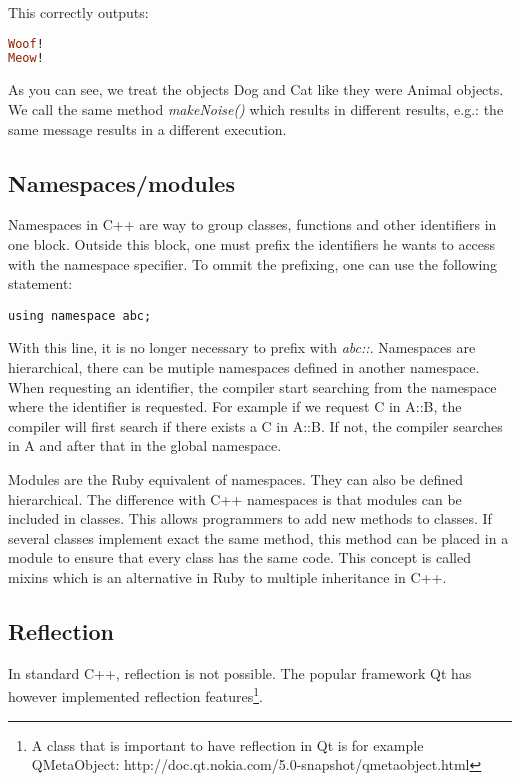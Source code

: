 \documentclass[10pt,a4paper,twocolumn]{article}
\begin{document}
This correctly outputs: 

\begin{lstlisting}[language=Ruby]
Woof!
Meow!
\end{lstlisting}

As you can see, we treat the objects Dog and Cat like they were Animal objects. We call the same method \textit{makeNoise()} which results in different results, e.g.: the same message results in a different execution.

\subsection{Namespaces/modules}
Namespaces in C++ are way to group classes, functions and other identifiers in one block. Outside this block, one must prefix the identifiers he wants to access with the namespace specifier. To ommit the prefixing, one can use the following statement:

\begin{lstlisting}
using namespace abc;
\end{lstlisting}

With this line, it is no longer necessary to prefix with \textit{abc::}. Namespaces are hierarchical, there can be mutiple namespaces defined in another namespace. When requesting an identifier, the compiler start searching from the namespace where the identifier is requested. For example if we request C in A::B, the compiler will first search if there exists a C in A::B. If not, the compiler searches in A and after that in the global namespace.

Modules are the Ruby equivalent of namespaces. They can also be defined hierarchical. The difference with C++ namespaces is that modules can be included in classes. This allows programmers to add new methods to classes. If several classes implement exact the same method, this method can be placed in a module to ensure that every class has the same code. This concept is called mixins which is an alternative in Ruby to multiple inheritance in C++. 

\subsection{Reflection}
In standard C++, reflection is not possible. The popular framework Qt has however implemented reflection features\footnote{A class that is important to have reflection in Qt is for example QMetaObject: http://doc.qt.nokia.com/5.0-snapshot/qmetaobject.html}.
\end{document}
